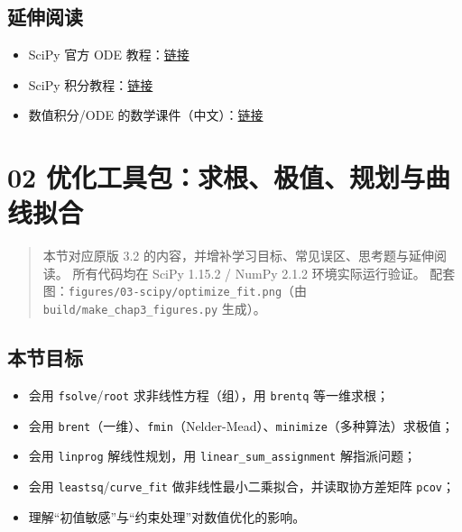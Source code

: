 \subsection{延伸阅读}\label{ux5ef6ux4f38ux9605ux8bfb-10}

\begin{itemize}
\tightlist
\item
  SciPy 官方 ODE
  教程：\href{https://docs.scipy.org/doc/scipy/reference/generated/scipy.integrate.solve_ivp.html}{链接}
\item
  SciPy
  积分教程：\href{https://docs.scipy.org/doc/scipy/tutorial/integrate.html}{链接}
\item
  数值积分/ODE
  的数学课件（中文）：\href{https://docs.scipy.org.cn/doc/scipy/reference/integrate.html}{链接}
\end{itemize}

\section{02
优化工具包：求根、极值、规划与曲线拟合}\label{ux4f18ux5316ux5de5ux5177ux5305ux6c42ux6839ux6781ux503cux89c4ux5212ux4e0eux66f2ux7ebfux62dfux5408}

\begin{quote}
本节对应原版 3.2 的内容，并增补学习目标、常见误区、思考题与延伸阅读。
所有代码均在 SciPy 1.15.2 / NumPy 2.1.2 环境实际运行验证。
配套图：\texttt{figures/03-scipy/optimize\_fit.png}（由
\texttt{build/make\_chap3\_figures.py} 生成）。
\end{quote}

\subsection{本节目标}\label{ux672cux8282ux76eeux6807-14}

\begin{itemize}
\tightlist
\item
  会用 \texttt{fsolve}/\texttt{root} 求非线性方程（组），用
  \texttt{brentq} 等一维求根；
\item
  会用
  \texttt{brent}（一维）、\texttt{fmin}（Nelder-Mead）、\texttt{minimize}（多种算法）求极值；
\item
  会用 \texttt{linprog} 解线性规划，用 \texttt{linear\_sum\_assignment}
  解指派问题；
\item
  会用 \texttt{leastsq}/\texttt{curve\_fit}
  做非线性最小二乘拟合，并读取协方差矩阵 \texttt{pcov}；
\item
  理解``初值敏感''与``约束处理''对数值优化的影响。
\end{itemize}

